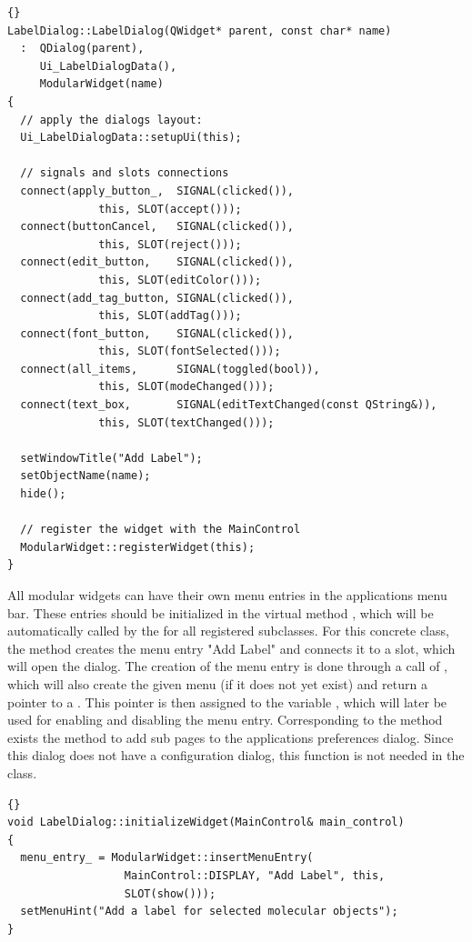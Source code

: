 \begin{lstlisting}{}
LabelDialog::LabelDialog(QWidget* parent, const char* name)
  :  QDialog(parent),
     Ui_LabelDialogData(),
     ModularWidget(name)
{
  // apply the dialogs layout:
  Ui_LabelDialogData::setupUi(this);

  // signals and slots connections
  connect(apply_button_,  SIGNAL(clicked()),
              this, SLOT(accept()));
  connect(buttonCancel,   SIGNAL(clicked()),
              this, SLOT(reject()));
  connect(edit_button,    SIGNAL(clicked()),
              this, SLOT(editColor()));
  connect(add_tag_button, SIGNAL(clicked()),
              this, SLOT(addTag()));
  connect(font_button,    SIGNAL(clicked()),
              this, SLOT(fontSelected()));
  connect(all_items,      SIGNAL(toggled(bool)),
              this, SLOT(modeChanged()));
  connect(text_box,       SIGNAL(editTextChanged(const QString&)),
              this, SLOT(textChanged()));

  setWindowTitle("Add Label");
  setObjectName(name);
  hide();

  // register the widget with the MainControl
  ModularWidget::registerWidget(this);
}
\end{lstlisting}

All modular widgets can have their own menu entries in the applications menu 
bar. These entries should be initialized in the virtual method 
, which will be automatically called by the 
 for all registered  subclasses. 
For this concrete class, the method creates the menu entry "Add Label" and 
connects it to a slot, which will open the dialog. The creation of the menu 
entry is done through a call of , which will also 
create the given menu (if it does not yet exist) and return a pointer to a 
. This pointer is then assigned to the variable , 
which will later be used for enabling and disabling the menu entry.
Corresponding to the method  exists the 
 method to add sub pages to the applications 
preferences dialog. Since this dialog does not have a configuration dialog, 
this function is not needed in the  class.

\begin{lstlisting}{}
void LabelDialog::initializeWidget(MainControl& main_control)
{
  menu_entry_ = ModularWidget::insertMenuEntry(
                  MainControl::DISPLAY, "Add Label", this,
                  SLOT(show()));
  setMenuHint("Add a label for selected molecular objects");   
}
\end{lstlisting}


